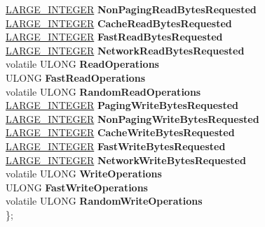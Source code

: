 \begin{DoxyCompactItemize}
\begin{tabbing}
\>\hyperlink{union___l_a_r_g_e___i_n_t_e_g_e_r}{LARGE\_INTEGER} {\bfseries NonPagingReadBytesRequested}\\
\>\hyperlink{union___l_a_r_g_e___i_n_t_e_g_e_r}{LARGE\_INTEGER} {\bfseries CacheReadBytesRequested}\\
\>\hyperlink{union___l_a_r_g_e___i_n_t_e_g_e_r}{LARGE\_INTEGER} {\bfseries FastReadBytesRequested}\\
\>\hyperlink{union___l_a_r_g_e___i_n_t_e_g_e_r}{LARGE\_INTEGER} {\bfseries NetworkReadBytesRequested}\\
\>volatile ULONG {\bfseries ReadOperations}\\
\>ULONG {\bfseries FastReadOperations}\\
\>volatile ULONG {\bfseries RandomReadOperations}\\
\>\hyperlink{union___l_a_r_g_e___i_n_t_e_g_e_r}{LARGE\_INTEGER} {\bfseries PagingWriteBytesRequested}\\
\>\hyperlink{union___l_a_r_g_e___i_n_t_e_g_e_r}{LARGE\_INTEGER} {\bfseries NonPagingWriteBytesRequested}\\
\>\hyperlink{union___l_a_r_g_e___i_n_t_e_g_e_r}{LARGE\_INTEGER} {\bfseries CacheWriteBytesRequested}\\
\>\hyperlink{union___l_a_r_g_e___i_n_t_e_g_e_r}{LARGE\_INTEGER} {\bfseries FastWriteBytesRequested}\\
\>\hyperlink{union___l_a_r_g_e___i_n_t_e_g_e_r}{LARGE\_INTEGER} {\bfseries NetworkWriteBytesRequested}\\
\>volatile ULONG {\bfseries WriteOperations}\\
\>ULONG {\bfseries FastWriteOperations}\\
\>volatile ULONG {\bfseries RandomWriteOperations}\\
\}; \\


\end{tabbing}
\end{DoxyCompactItemize}
